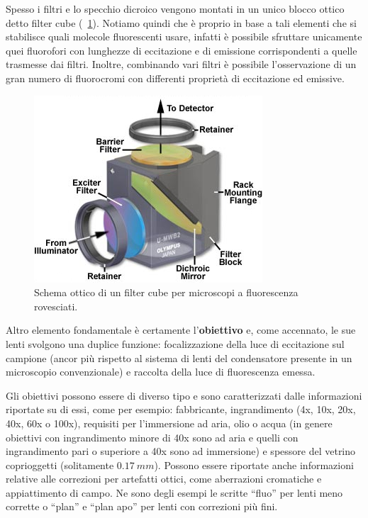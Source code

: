 Spesso i filtri e lo specchio dicroico vengono montati in un unico blocco ottico detto filter cube (\figurename~\ref{fig:cube}). 
Notiamo quindi che è proprio in base a tali elementi che si stabilisce quali molecole fluorescenti usare, infatti è possibile sfruttare unicamente quei fluorofori con lunghezze di eccitazione e di emissione corrispondenti a quelle trasmesse dai filtri. 
Inoltre, combinando vari filtri è possibile l'osservazione di un gran numero di fluorocromi con differenti proprietà di eccitazione ed emissive.

\begin{figure}
 \centering
 \includegraphics[scale=.65]{img/CAP2cube.jpg}
 \caption{\small{Schema ottico di un filter cube per microscopi a fluorescenza rovesciati.}}
 \label{fig:cube}
\end{figure}

Altro elemento fondamentale è certamente l'\textbf{obiettivo} e, come accennato, le sue lenti svolgono una duplice funzione: focalizzazione della luce di eccitazione sul campione (ancor più rispetto al sistema di lenti del condensatore presente in un microscopio convenzionale) e raccolta della luce di fluorescenza emessa. 

Gli obiettivi possono essere di diverso tipo e sono caratterizzati dalle informazioni riportate su di essi, come per esempio: fabbricante, ingrandimento (4x, 10x, 20x, 40x, 60x o 100x), requisiti per l'immersione ad aria, olio o acqua (in genere obiettivi con ingrandimento minore di 40x sono ad aria e quelli con ingrandimento pari o superiore a 40x sono ad immersione) e spessore del vetrino coprioggetti (solitamente $0.17\ mm$).  
Possono essere riportate anche informazioni relative alle correzioni per artefatti ottici, come aberrazioni cromatiche e appiattimento di campo.
Ne sono degli esempi le scritte ``fluo'' per lenti meno corrette o ``plan'' e ``plan apo'' per lenti con correzioni più fini. 

